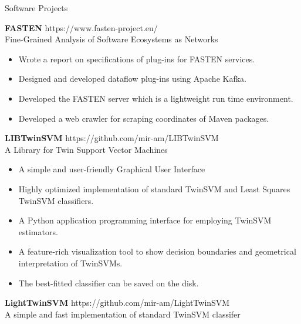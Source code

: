 \documentclass{resume} %
\begin{document}
\begin{rSection}{Software Projects}
	
	{\bf FASTEN} \hfill {https://www.fasten-project.eu/} \\ 
	Fine-Grained Analysis of Software Ecosystems as Networks \\
	
	
    \begin{itemize}
		\item Wrote a report on specifications of plug-ins for FASTEN services.
		\item Designed and developed dataflow plug-ins using Apache Kafka.
		\item Developed the FASTEN server which is a lightweight run time environment.
		\item Developed a web crawler for scraping coordinates of Maven packages.
	\end{itemize}
	
	{\bf LIBTwinSVM} \hfill {https://github.com/mir-am/LIBTwinSVM} \\ 
	A Library for Twin Support Vector Machines \\
	
	\begin{itemize}
		\item A simple and user-friendly Graphical User Interface
		\item Highly optimized implementation of standard TwinSVM and Least Squares TwinSVM classifiers.
		\item A Python application programming interface for employing TwinSVM estimators.
		\item A feature-rich visualization tool to show decision boundaries and geometrical interpretation of TwinSVMs.
		\item The best-fitted classifier can be saved on the disk.
	\end{itemize}

	\newpage
	
	{\bf LightTwinSVM} \hfill { https://github.com/mir-am/LightTwinSVM} \\ 
	A simple and fast implementation of standard TwinSVM classifer  \\
	

\end{rSection}
\end{document}

